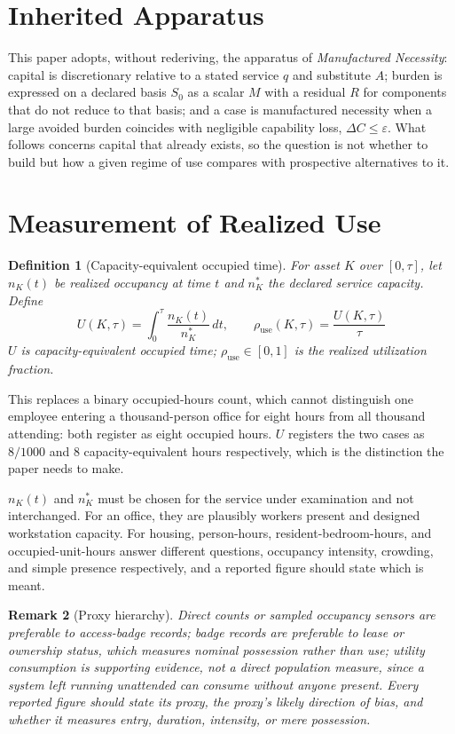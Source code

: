 \documentclass[11pt]{article}
\newtheorem{definition}{Definition}[section]
\newtheorem{remark}[definition]{Remark}
\begin{document}
\section{Inherited Apparatus}

This paper adopts, without rederiving, the apparatus of \emph{Manufactured Necessity}: capital is discretionary relative to a stated service $q$ and substitute $A$; burden is expressed on a declared basis $S_0$ as a scalar $M$ with a residual $R$ for components that do not reduce to that basis; and a case is manufactured necessity when a large avoided burden coincides with negligible capability loss, $\Delta C \leq \varepsilon$. What follows concerns capital that already exists, so the question is not whether to build but how a given regime of use compares with prospective alternatives to it.

\section{Measurement of Realized Use}

\begin{definition}[Capacity-equivalent occupied time]
For asset $K$ over $[0,\tau]$, let $n_K(t)$ be realized occupancy at time $t$ and $n_K^{*}$ the declared service capacity. Define
\[
U(K,\tau) = \int_0^\tau \frac{n_K(t)}{n_K^{*}}\,dt, \qquad \rho_{\text{use}}(K,\tau) = \frac{U(K,\tau)}{\tau}
\]
$U$ is capacity-equivalent occupied time; $\rho_{\text{use}} \in [0,1]$ is the realized utilization fraction.
\end{definition}

This replaces a binary occupied-hours count, which cannot distinguish one employee entering a thousand-person office for eight hours from all thousand attending: both register as eight occupied hours. $U$ registers the two cases as $8/1000$ and $8$ capacity-equivalent hours respectively, which is the distinction the paper needs to make.

$n_K(t)$ and $n_K^{*}$ must be chosen for the service under examination and not interchanged. For an office, they are plausibly workers present and designed workstation capacity. For housing, person-hours, resident-bedroom-hours, and occupied-unit-hours answer different questions, occupancy intensity, crowding, and simple presence respectively, and a reported figure should state which is meant.

\begin{remark}[Proxy hierarchy]
Direct counts or sampled occupancy sensors are preferable to access-badge records; badge records are preferable to lease or ownership status, which measures nominal possession rather than use; utility consumption is supporting evidence, not a direct population measure, since a system left running unattended can consume without anyone present. Every reported figure should state its proxy, the proxy's likely direction of bias, and whether it measures entry, duration, intensity, or mere possession.
\end{remark}
\end{document}
